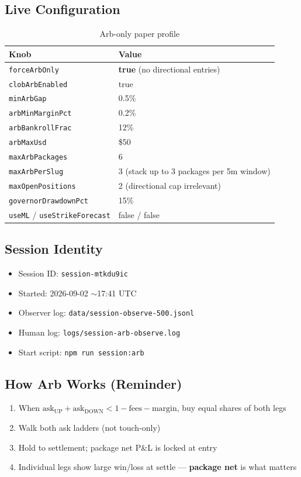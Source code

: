 \documentclass[11pt,a4paper]{article}
\begin{document}
\subsection{Live Configuration}
\begin{table}[h]
\centering
\small
\begin{tabular}{@{}ll@{}}
\toprule
\textbf{Knob} & \textbf{Value} \\
\midrule
\texttt{forceArbOnly} & \textbf{true} (no directional entries) \\
\texttt{clobArbEnabled} & true \\
\texttt{minArbGap} & 0.5\% \\
\texttt{arbMinMarginPct} & 0.2\% \\
\texttt{arbBankrollFrac} & 12\% \\
\texttt{arbMaxUsd} & \$50 \\
\texttt{maxArbPackages} & 6 \\
\texttt{maxArbPerSlug} & 3 (stack up to 3 packages per 5m window) \\
\texttt{maxOpenPositions} & 2 (directional cap irrelevant) \\
\texttt{governorDrawdownPct} & 15\% \\
\texttt{useML} / \texttt{useStrikeForecast} & false / false \\
\bottomrule
\end{tabular}
\caption{Arb-only paper profile}
\end{table}

\subsection{Session Identity}
\begin{itemize}[noitemsep]
  \item Session ID: \texttt{session-mtkdu9ic}
  \item Started: 2026-09-02 $\sim$17:41 UTC
  \item Observer log: \texttt{data/session-observe-500.jsonl}
  \item Human log: \texttt{logs/session-arb-observe.log}
  \item Start script: \texttt{npm run session:arb}
\end{itemize}

\subsection{How Arb Works (Reminder)}
\begin{enumerate}[noitemsep]
  \item When $\text{ask}_{\text{UP}} + \text{ask}_{\text{DOWN}} < 1 - \text{fees} - \text{margin}$, buy equal shares of both legs
  \item Walk both ask ladders (not touch-only)
  \item Hold to settlement; package net P\&L is locked at entry
  \item Individual legs show large win/loss at settle --- \textbf{package net} is what matters
\end{enumerate}
\end{document}
